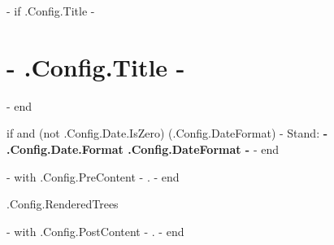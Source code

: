 \documentclass[10pt,paper=a4,ngerman,parskip,DIV=15,BCOR=0mm,%
{{ if .Config.DocumentOptions -}}
{{ .Config.DocumentOptions }}%
{{- end }}%
]{scrartcl}
\begin{document}
{{- if .Config.Title -}}
\section*{ {{- .Config.Title -}} }
{{- end }}

{{ if and (not .Config.Date.IsZero) (.Config.DateFormat) -}}
Stand: \textbf{ {{- .Config.Date.Format .Config.DateFormat -}} }
{{- end }}


{{- with .Config.PreContent -}}
{{ . }}
{{- end }}


{{ .Config.RenderedTrees }}


{{- with .Config.PostContent -}}
{{ . }}
{{- end }}
\end{document}
